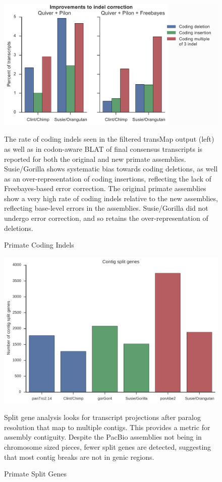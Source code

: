 \documentclass[fleqn,10pt]{wlscirep}
\begin{document}
\begin{figure}
\centering
\includegraphics[width=\textwidth,height=\textheight,keepaspectratio]{primate_indels.pdf}
\caption{Primate Coding Indels}
The rate of coding indels seen in the filtered transMap output (left) as well as in codon-aware BLAT of final consensus transcripts is reported for both the original and new primate assemblies. Susie/Gorilla shows systematic bias towards coding deletions, as well as an over-representation of coding insertions, reflecting the lack of Freebayes-based error correction. The original primate assemblies show a very high rate of coding indels relative to the new assemblies, reflecting base-level errors in the assemblies. Susie/Gorilla did not undergo error correction, and so retains the over-representation of deletions.
\label{supp_fig:primate_indels}
\end{figure}

\begin{figure}
\centering
\includegraphics[width=\textwidth,height=\textheight,keepaspectratio]{split_genes.pdf}
\caption{Primate Split Genes}
\label{supp_fig:primate_split_genes}
Split gene analysis looks for transcript projections after paralog resolution that map to multiple contigs. This provides a metric for assembly contiguity. Despite the PacBio assemblies not being in chromosome sized pieces, fewer split genes are detected, suggesting that most contig breaks are not in genic regions.
\end{figure}
\end{document}
